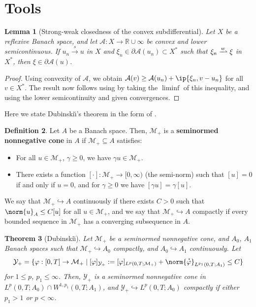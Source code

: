 \documentclass[a4paper,12pt]{article}
\newcommand{\R}{\mathbb{R}}
\newcommand{\calM}{\mathcal{M}}
\newcommand{\pl}{\partial}
\newcommand\DT[1]{\mathchoice
                 {{\buildrel{\hspace*{.1em}\text{\LARGE.}}\over{#1}}}
                 {{\buildrel{\hspace*{.1em}\text{\Large.}}\over{#1}}}
                 {{\buildrel{\hspace*{.1em}\text{\large.}}\over{#1}}}
                 {{\buildrel{\hspace*{.1em}\text{\large.}}\over{#1}}}}
\renewcommand{\dot}{\DT}
\newcommand{\wto}{\xrightharpoonup{w}}
\newcommand{\sto}{\xrightarrow{s}}
\theoremstyle{plain}
\newtheorem{Th}{Theorem}[section]
\newtheorem{Lemma}[Th]{Lemma}
\theoremstyle{definition}
\newtheorem{Def}[Th]{Definition}
\numberwithin{equation}{section}
\begin{document}
%
%
%
%
%
%
%
%

%

%
%
%
%
%
%

%

%
    
%


\appendix
\section{Tools}

\begin{Lemma}[Strong-weak closedness of the convex subdifferential]
	\label{Lemma:Strong-weakClosednessSubdiff}
	Let $X$ be a reflexive Banach space, and let $\mathcal{A}:X\to \R\cup\infty$ be convex and lower semicontinuous. If $u_n\sto u$ in $X$ and $\xi_n \in \pl \mathcal{A}(u_n)\subset X^*$ such that $\xi_n\wto \xi$ in $X^*$, then $\xi\in \pl \mathcal{A}(u)$.
	\end{Lemma}	
	\begin{proof}
	Using convexity of $\mathcal{A}$, we obtain $\mathcal{A}(v)\geq \mathcal{A}(u_n) + \ip{\xi_n, v-u_n}$ for all $v\in X^*$. The result now follows using by taking the $\liminf$ of this inequality, and using the lower semicontinuity and given convergences.
	\end{proof}



Here we state Dubinski\u\i's theorem \cite{Dubi1965WCfNEaPE} in the form of \cite{BarSul2012RoDNCET}.
\begin{Def}
Let $A$ be a Banach space. Then, $\calM_+$ is a \textbf{seminormed nonnegative cone} in $A$ if $\calM_+\subseteq A$ satisfies:
\begin{itemize}
\item[(i)] For all $u\in\calM_+$, $\gamma\geq 0$, we have $\gamma u\in \calM_+$.
\item[(ii)] There exists a function $[\cdot]:\calM_+\to [0,\infty)$ (the semi-norm) such that $[u]=0$ if and only if $u=0$, and for $\gamma\geq 0$ we have $[\gamma u] = \gamma[u]$.
\end{itemize}
We say that $\calM_+\hookrightarrow A$ continuously if there exists $C>0$ such that $\norm{u}_A\leq C[u]$ for all $u\in \calM_+$, and we say that $\calM_+\hookrightarrow A$ compactly if every bounded sequence in $\calM_+$ has a converging subsequence in $A$.
\end{Def}
\begin{Th}[Dubinski\u\i] Let $\mathcal{M}_+$ be a seminormed nonnegative cone, and $A_0$, $A_1$ Banach spaces such that $\mathcal{M}_+ \hookrightarrow A_0$ compactly, and $A_0\hookrightarrow A_1$ continuously. Let 
\[
\mathcal{Y}_+ = \{ \varphi:[0,T]\to \mathcal{M}_+ \mid [\varphi]_{\mathcal{Y}_+} := [\varphi]_{L^p(0,T;\mathcal{M}_+)} + \norm{\dot\varphi}_{L^{p_1}(0,T;A_1)} \leq C\}
\]
for $1\leq p$, $p_1\leq \infty$. Then, $\mathcal{Y}_+$ is a seminormed nonnegative cone in $L^p(0,T;A_0)\cap W^{1,p_1}(0,T;A_1)$, and $\mathcal{Y}_+ \hookrightarrow L^p(0,T;A_0)$ compactly if either $p_1>1$ or $p<\infty$.
\label{Th:DubinskiiCompactness}
\end{Th} 
\end{document}

